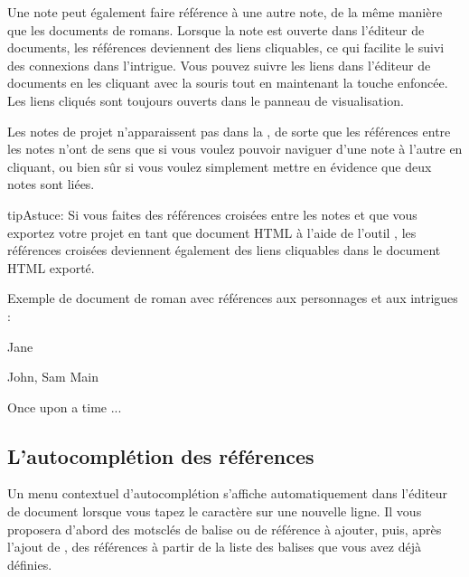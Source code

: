 \documentclass[a4paper,11pt,french]{sphinxmanual}
\begin{document}
\sphinxAtStartPar
Une note peut également faire référence à une autre note, de la même manière que les documents de romans. Lorsque la note est ouverte dans l’éditeur de documents, les références deviennent des liens cliquables, ce qui facilite le suivi des connexions dans l’intrigue. Vous pouvez suivre les liens dans l’éditeur de documents en les cliquant avec la souris tout en maintenant la touche  enfoncée. Les liens cliqués sont toujours ouverts dans le panneau de visualisation.

\sphinxAtStartPar
Les notes de projet n’apparaissent pas dans la , de sorte que les références entre les notes n’ont de sens que si vous voulez pouvoir naviguer d’une note à l’autre en cliquant, ou bien sûr si vous voulez simplement mettre en évidence que deux notes sont liées.

\begin{sphinxadmonition}{tip}{Astuce:}
\sphinxAtStartPar
Si vous faites des références croisées entre les notes et que vous exportez votre projet en tant que document HTML à l’aide de l’outil , les références croisées deviennent également des liens cliquables dans le document HTML exporté.
\end{sphinxadmonition}

\sphinxAtStartPar
Exemple de document de roman avec références aux personnages et aux intrigues :

\begin{sphinxVerbatim}[commandchars=\\\{\}]

 Jane


 John, Sam
 Main

Once upon a time ...
\end{sphinxVerbatim}


\subsection{L’auto\sphinxhyphen{}complétion des références}
\label{\detokenize{project_references:the-references-auto-completer}}\label{\detokenize{project_references:a-references-completer}}
\sphinxAtStartPar
Un menu contextuel d’auto\sphinxhyphen{}complétion s’affiche automatiquement dans l’éditeur de document lorsque vous tapez le caractère  sur une nouvelle ligne. Il vous proposera d’abord des mots\sphinxhyphen{}clés de balise ou de référence à ajouter, puis, après l’ajout de \sphinxcode{\sphinxupquote{:}}, des références à partir de la liste des balises que vous avez déjà définies.
\end{document}
